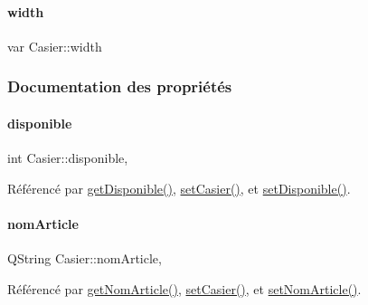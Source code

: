 \mbox{\label{class_casier_ad3669533289f2312284be7fce28141f3}} 
\paragraph{\texorpdfstring{width}{width}}
{\footnotesize\ttfamily var Casier\+::width\hspace{0.3cm}{\ttfamily [private]}}



\subsubsection{Documentation des propriétés}
\mbox{\label{class_casier_a5bf1314910ade36747faffdd891d94e9}} 
\paragraph{\texorpdfstring{disponible}{disponible}}
{\footnotesize\ttfamily int Casier\+::disponible\hspace{0.3cm}{\ttfamily [read]}, {\ttfamily [write]}}



Référencé par \hyperlink{class_casier_a7d25b1a4bdbe4e600734cda8fb944258}{get\+Disponible()}, \hyperlink{class_casier_a140dc38c9e87815b2ce7fc6dce33080b}{set\+Casier()}, et \hyperlink{class_casier_ac41e3c5e88e638c1375b35940c1870ed}{set\+Disponible()}.

\mbox{\label{class_casier_a9632bfa0e94a522bab9da1c3834eaf5a}} 
\paragraph{\texorpdfstring{nom\+Article}{nomArticle}}
{\footnotesize\ttfamily Q\+String Casier\+::nom\+Article\hspace{0.3cm}{\ttfamily [read]}, {\ttfamily [write]}}



Référencé par \hyperlink{class_casier_ad1e4ebd48218bc19d8e29e98b6a9e939}{get\+Nom\+Article()}, \hyperlink{class_casier_a140dc38c9e87815b2ce7fc6dce33080b}{set\+Casier()}, et \hyperlink{class_casier_ab46ac6ac9c4fae70f9b8ef23f856fa52}{set\+Nom\+Article()}.

